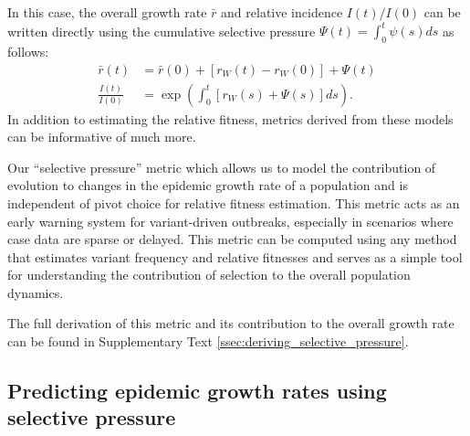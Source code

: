 \documentclass[11pt,oneside,letterpaper]{article}
\newcommand{\wt}{W}
\begin{document}
In this case, the overall growth rate $\bar{r}$ and relative incidence $I(t) / I(0)$ can be written directly using the cumulative selective pressure $\Psi(t) = \int_0^t \psi(s)ds$ as follows:
\begin{align}
    \bar{r}(t) &= \bar{r}(0) + [r_{\wt}(t) - r_{\wt}(0)] + \Psi(t)\\
    \frac{I(t)}{I(0)} &= \exp \left( \int_0^t [r_{\wt}(s) + \Psi(s)]ds \right).
\end{align}
In addition to estimating the relative fitness, metrics derived from these models can be informative of much more.

Our ``selective pressure'' metric which allows us to model the contribution of evolution to changes in the epidemic growth rate of a population and is independent of pivot choice for relative fitness estimation.
This metric acts as an early warning system for variant-driven outbreaks, especially in scenarios where case data are sparse or delayed.
This metric can be computed using any method that estimates variant frequency and relative fitnesses and serves as a simple tool for understanding the contribution of selection to the overall population dynamics.

The full derivation of this metric and its contribution to the overall growth rate can be found in Supplementary Text \ref{ssec:deriving_selective_pressure}.

\subsection*{Predicting epidemic growth rates using selective pressure}
\end{document}
